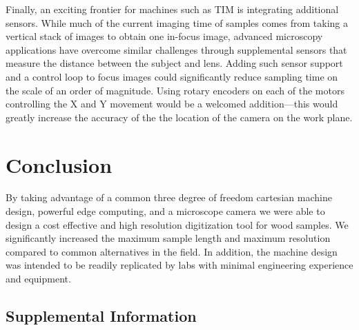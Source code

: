 \documentclass[a4paper,12pt]{article}
\begin{document}
Finally, an exciting frontier for machines such as TIM is integrating additional sensors. While much of the current imaging time of samples comes from taking a vertical stack of images to obtain one in-focus image, advanced microscopy applications have overcome similar challenges through supplemental sensors that measure the distance between the subject and lens.
Adding such sensor support and a control loop to focus images could significantly reduce sampling time on the scale of an order of magnitude. 
Using rotary encoders on each of the motors controlling the X and Y movement would be a welcomed addition---this would greatly increase the 
accuracy of the the location of the camera on the work plane.  

\section{Conclusion} %
By taking advantage of a common three degree of freedom cartesian machine design, powerful edge computing, and a microscope camera we were able to design a cost effective and high resolution digitization tool for wood samples. 
We significantly increased the maximum sample length and maximum resolution compared to common alternatives in the field. 
In addition, the machine design was intended to be readily replicated by labs with minimal engineering experience and equipment. 

\subsection{Supplemental Information}
\renewcommand{\thetable}{S\arabic{table}}




\end{document}

